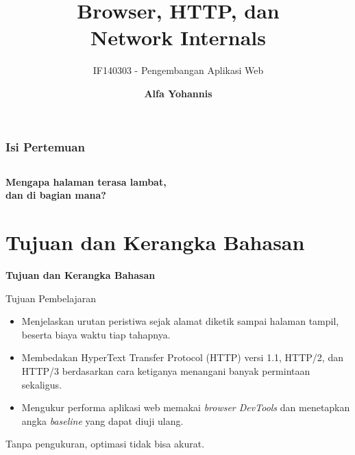 \documentclass[aspectratio=169, table, 12pt]{beamer}
\title{\Huge Browser, HTTP, dan\\ \vspace{10pt} Network Internals}
\subtitle{IF140303 - Pengembangan Aplikasi Web}
\author{\textbf{Alfa Yohannis}}
\begin{document}
\frame{\titlepage}

\begin{frame}[fragile]
  \frametitle{Isi Pertemuan}
  \vspace{20pt}
  \begin{columns}[t]
    \tableofcontents[sections={1-4}]

    \tableofcontents[sections={5-8}]
  \end{columns}
\end{frame}

\begin{frame}{\hfill}
  \centering
  \Huge{\textbf{Mengapa halaman terasa lambat,\\dan di bagian mana?}}
\end{frame}

\section{Tujuan dan Kerangka Bahasan}

\begin{frame}{\hfill}
  \centering
  \Huge{\textbf{Tujuan dan Kerangka Bahasan}}
\end{frame}

\begin{frame}{{\Large Tujuan Pembelajaran}}
  \vspace{15pt}
  \begin{itemize}
    \item Menjelaskan urutan peristiwa sejak alamat diketik sampai halaman
          tampil, beserta biaya waktu tiap tahapnya.
    \item Membedakan HyperText Transfer Protocol (HTTP) versi 1.1, HTTP/2,
          dan HTTP/3 berdasarkan cara ketiganya menangani banyak permintaan
          sekaligus.
    \item Mengukur performa aplikasi web memakai \textit{browser DevTools}
          dan menetapkan angka \textit{baseline} yang dapat diuji ulang.
  \end{itemize}
  \vspace{10pt}
  {\footnotesize Tanpa pengukuran, optimasi tidak bisa akurat.}
\end{frame}
\end{document}
